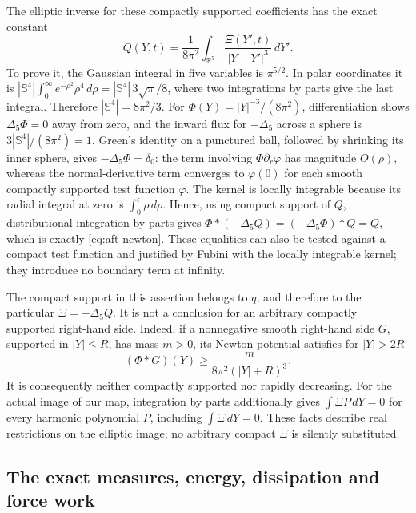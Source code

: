 The elliptic inverse for these compactly supported coefficients has the
exact constant
\begin{equation}\label{eq:aft-newton}
 Q(Y,t)=\frac{1}{8\pi^2}\int_{\mathbb R^5}
                 \frac{\Xi(Y',t)}{|Y-Y'|^3}\,dY'.
\end{equation}
To prove it, the Gaussian integral in five variables is \(\pi^{5/2}\).
In polar coordinates it is
\(|\mathbb S^4|\int_0^\infty e^{-\rho^2}\rho^4\,d\rho
=|\mathbb S^4|\,3\sqrt\pi/8\), where two integrations by parts
give the last integral.  Therefore \(|\mathbb S^4|=8\pi^2/3\).
For \(\Phi(Y)=|Y|^{-3}/(8\pi^2)\), differentiation shows
\(\Delta_5\Phi=0\) away from zero, and the inward flux for
\(-\Delta_5\) across a sphere is
\(3|\mathbb S^4|/(8\pi^2)=1\).
Green's identity on a punctured ball, followed by shrinking its inner
sphere, gives \(-\Delta_5\Phi=\delta_0\): the term involving
\(\Phi\partial_r\varphi\) has magnitude \(O(\rho)\), whereas the
normal-derivative term converges to \(\varphi(0)\) for each smooth
compactly supported test function \(\varphi\).
The kernel is locally integrable because its radial integral at zero is
\(\int_0^\epsilon\rho\,d\rho\).  Hence, using compact support of
\(Q\), distributional integration by parts gives
\(\Phi*(-\Delta_5Q)=(-\Delta_5\Phi)*Q=Q\), which is exactly
\eqref{eq:aft-newton}.  These equalities can also be tested against a
compact test function and justified by Fubini with the locally integrable
kernel; they introduce no boundary term at infinity.

The compact support in this assertion belongs to \(q\), and therefore
to the particular \(\Xi=-\Delta_5Q\).  It is not a conclusion for an
arbitrary compactly supported right-hand side.  Indeed, if a nonnegative
smooth right-hand side \(G\), supported in \(|Y|\leq R\), has mass
\(m>0\), its Newton potential satisfies for \(|Y|>2R\)
\[
 (\Phi*G)(Y)\geq\frac{m}{8\pi^2(|Y|+R)^3}.
\]
It is consequently neither compactly supported nor rapidly decreasing.
For the actual image of our map, integration by parts additionally gives
\(\int\Xi P\,dY=0\) for every harmonic polynomial \(P\), including
\(\int\Xi\,dY=0\).  These facts describe real restrictions on the
elliptic image; no arbitrary compact \(\Xi\) is silently substituted.

\subsection{The exact measures, energy, dissipation and force work}

